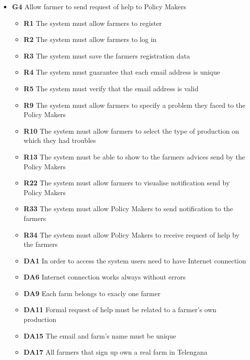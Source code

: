 \begin{itemize}
    \item \textbf{G4} Allow farmer to send request of help to Policy Makers
        \begin{itemize}
        \renewcommand\labelitemi{--}
        \item \textbf{R1} The system must allow farmers to register
        \item \textbf{R2} The system must allow farmers to log in
        \item \textbf{R3} The system must save the farmers registration data
        \item \textbf{R4} The system must guarantee that each email address is unique
        \item \textbf{R5} The system must verify that the email address is valid
        \item \textbf{R9} The system must allow farmers to specify a problem they faced to the Policy Makers
        \item \textbf{R10} The system must allow farmers to select the type of production on which they had troubles
        \item \textbf{R13} The system must be able to show to the farmers advices send by the Policy Makers
        \item \textbf{R22} The system must allow farmers to visualise notification send by Policy Makers
        \item \textbf{R33} The system must allow Policy Makers to send notification to the farmers
        \item \textbf{R34} The system must allow Policy Makers to receive request of help by the farmers
        \item \textbf{DA1} In order to access the system users need to have Internet connection
        \item \textbf{DA6} Internet connection works always without errors
        \item \textbf{DA9} Each farm belongs to exacly one farmer
        \item \textbf{DA11} Formal request of help must be related to a farmer's own production
        \item \textbf{DA15} The email and farm's name must be unique
        \item \textbf{DA17} All farmers that sign up own a real farm in Telengana
        \end{itemize} 
    

\end{itemize}
